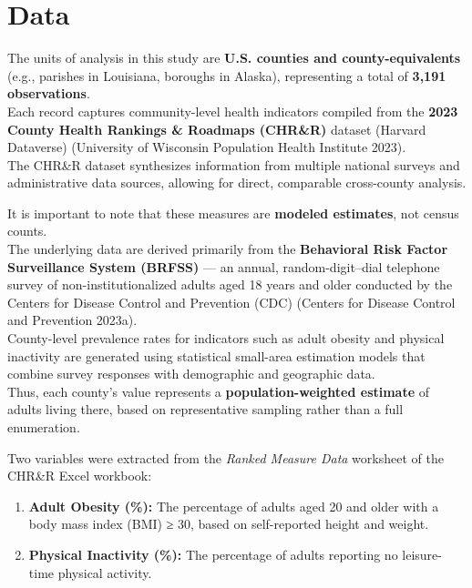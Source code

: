\documentclass[
  letterpaper,
  DIV=11,
  numbers=noendperiod]{scrartcl}
\providecommand{\tightlist}{%
  \setlength{\itemsep}{0pt}\setlength{\parskip}{0pt}}\usepackage{longtable,booktabs,array}
\begin{document}
\section{Data}\label{data}

The units of analysis in this study are \textbf{U.S. counties and
county-equivalents} (e.g., parishes in Louisiana, boroughs in Alaska),
representing a total of \textbf{3,191 observations}.\\
Each record captures community-level health indicators compiled from the
\textbf{2023 County Health Rankings \& Roadmaps (CHR\&R)} dataset
(Harvard Dataverse) (University of Wisconsin Population Health Institute
2023).\\
The CHR\&R dataset synthesizes information from multiple national
surveys and administrative data sources, allowing for direct, comparable
cross-county analysis.

It is important to note that these measures are \textbf{modeled
estimates}, not census counts.\\
The underlying data are derived primarily from the \textbf{Behavioral
Risk Factor Surveillance System (BRFSS)} --- an annual,
random-digit--dial telephone survey of non-institutionalized adults aged
18 years and older conducted by the Centers for Disease Control and
Prevention (CDC) (Centers for Disease Control and Prevention 2023a).\\
County-level prevalence rates for indicators such as adult obesity and
physical inactivity are generated using statistical small-area
estimation models that combine survey responses with demographic and
geographic data.\\
Thus, each county's value represents a \textbf{population-weighted
estimate} of adults living there, based on representative sampling
rather than a full enumeration.

Two variables were extracted from the \emph{Ranked Measure Data}
worksheet of the CHR\&R Excel workbook:

\begin{enumerate}
\def\labelenumi{\arabic{enumi}.}
\tightlist
\item
  \textbf{Adult Obesity (\%):} The percentage of adults aged 20 and
  older with a body mass index (BMI) ≥ 30, based on self-reported height
  and weight.\\
\item
  \textbf{Physical Inactivity (\%):} The percentage of adults reporting
  no leisure-time physical activity.
\end{enumerate}
\end{document}
